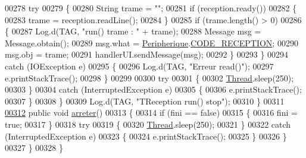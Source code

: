 \begin{DoxyCode}
00278                 \textcolor{keywordflow}{try}
00279                 \{
00280                     String trame = \textcolor{stringliteral}{""};
00281                     \textcolor{keywordflow}{if} (reception.ready())
00282                     \{
00283                         trame = reception.readLine();
00284                     \}
00285                     \textcolor{keywordflow}{if} (trame.length() > 0)
00286                     \{
00287                         Log.d(TAG, \textcolor{stringliteral}{"run() trame : "} + trame);
00288                         Message msg = Message.obtain();
00289                         msg.what = \hyperlink{classcom_1_1lasalle_1_1io__trucks_1_1_peripherique}{Peripherique}.\hyperlink{classcom_1_1lasalle_1_1io__trucks_1_1_peripherique_a2abb4880d1dd4140379b3ff71cff8cf3}{CODE\_RECEPTION};
00290                         msg.obj = trame;
00291                         handlerUI.sendMessage(msg);
00292                     \}
00293                 \}
00294                 \textcolor{keywordflow}{catch} (IOException e)
00295                 \{
00296                     Log.d(TAG, \textcolor{stringliteral}{"Erreur read()"});
00297                     e.printStackTrace();
00298                 \}
00299 
00300                 \textcolor{keywordflow}{try}
00301                 \{
00302                     \hyperlink{class_thread}{Thread}.sleep(250);
00303                 \}
00304                 \textcolor{keywordflow}{catch} (InterruptedException e)
00305                 \{
00306                     e.printStackTrace();
00307                 \}
00308             \}
00309             Log.d(TAG, \textcolor{stringliteral}{"TReception run() stop"});
00310         \}
00311 
\hyperlink{classcom_1_1lasalle_1_1io__trucks_1_1_peripherique_1_1_t_reception_ad02425d61d6c923521c8f66f6b854b3c}{00312}         \textcolor{keyword}{public} \textcolor{keywordtype}{void} \hyperlink{classcom_1_1lasalle_1_1io__trucks_1_1_peripherique_1_1_t_reception_ad02425d61d6c923521c8f66f6b854b3c}{arreter}()
00313         \{
00314             \textcolor{keywordflow}{if} (fini == \textcolor{keyword}{false})
00315             \{
00316                 fini = \textcolor{keyword}{true};
00317             \}
00318             \textcolor{keywordflow}{try}
00319             \{
00320                 \hyperlink{class_thread}{Thread}.sleep(250);
00321             \}
00322             \textcolor{keywordflow}{catch} (InterruptedException e)
00323             \{
00324                 e.printStackTrace();
00325             \}
00326         \}
00327     \}
00328 \}
\end{DoxyCode}
